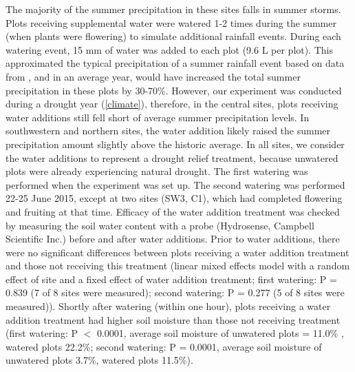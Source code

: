 \documentclass{article}
\begin{document}
The majority of the summer precipitation in these sites falls in summer storms. Plots receiving supplemental water were watered 1-2 times during the summer (when plants were flowering) to simulate additional rainfall events. During each watering event, 15 mm of water was added to each plot (9.6 L per plot). This approximated the typical precipitation of a summer rainfall event based on data from \citet{wang2012climatewna}, and in an average year, would have increased the total summer precipitation in these plots by 30-70\%. However, our experiment was conducted during a drought year (\autoref{climate}), therefore, in the central sites, plots receiving water additions still fell short of average summer precipitation levels. In southwestern and northern sites, the water addition likely raised the summer precipitation amount slightly above the historic average. In all sites, we consider the water additions to represent a drought relief treatment, because unwatered plots were already experiencing natural drought. The first watering was performed when the experiment was set up. The second watering was performed 22-25 June 2015, except at two sites (SW3, C1), which had completed flowering and fruiting at that time. Efficacy of the water addition treatment was checked by measuring the soil water content with a probe (Hydrosense, Campbell Scientific Inc.) before and after water additions. Prior to water additions, there were no significant differences between plots receiving a water addition treatment and those not receiving this treatment (linear mixed effects model with a random effect of site and a fixed effect of water addition treatment; first watering: P = 0.839 (7 of 8 sites were measured); second watering: P = 0.277 (5 of 8 sites were measured)). Shortly after watering (within one hour), plots receiving a water addition treatment had higher soil moisture than those not receiving treatment (first watering: P $<$ 0.0001, average soil moisture of unwatered plots = 11.0\% , watered plots 22.2\%; second watering: P = 0.0001, average soil moisture of unwatered plots 3.7\%, watered plots 11.5\%).
\end{document}

